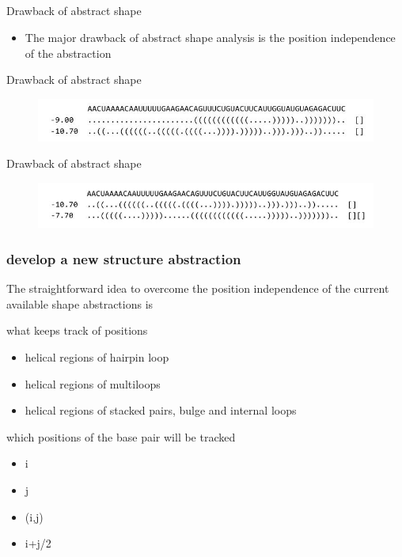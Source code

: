 \documentclass[ignorenonframetext,10pt]{beamer}
\begin{document}
\subsection{}
\begin{frame}
\frametitle{}
   \begin{block}{\small Drawback of abstract shape}
   \begin{itemize} 
   \item The major drawback of abstract shape analysis is the position
   independence of the abstraction
   \end{itemize}
   \end{block}
   \begin{block}{\small Drawback of abstract shape}
   \begin{figure}
     \includegraphics[scale=0.55]{images/drawback_1.jpg} 
   \end{figure}
   \end{block}
   \begin{block}{\small Drawback of abstract shape}
   \begin{figure}
     \includegraphics[scale=0.55]{images/drawback_2.jpg} 
   \end{figure}
   \end{block}
\end{frame}



\begin{frame}
\frametitle{develop a new structure abstraction}
    The straightforward idea to overcome the position independence of the
    current available shape abstractions is
    \begin{block}{what keeps track of positions}
    \begin{itemize} 
    \item helical regions of hairpin loop
    \item helical regions of multiloops %
    \item helical regions of stacked pairs, bulge and internal loops %
    \end{itemize}
    \end{block}
    \begin{block}{which positions of the base pair will be tracked}
    \begin{itemize} 
    \item i
    \item j   
    \item (i,j)
    \item i+j/2
    \end{itemize}    
    \end{block}
\end{frame}
\end{document}

